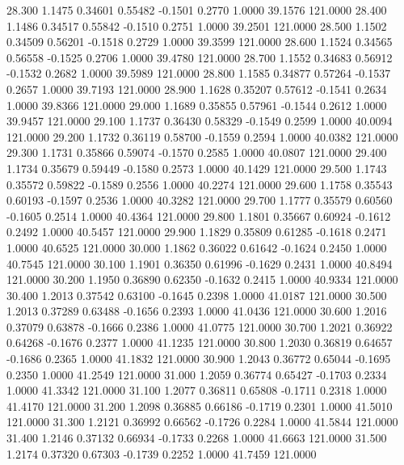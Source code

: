   28.300   1.1475   0.34601   0.55482  -0.1501   0.2770   1.0000  39.1576 121.0000
  28.400   1.1486   0.34517   0.55842  -0.1510   0.2751   1.0000  39.2501 121.0000
  28.500   1.1502   0.34509   0.56201  -0.1518   0.2729   1.0000  39.3599 121.0000
  28.600   1.1524   0.34565   0.56558  -0.1525   0.2706   1.0000  39.4780 121.0000
  28.700   1.1552   0.34683   0.56912  -0.1532   0.2682   1.0000  39.5989 121.0000
  28.800   1.1585   0.34877   0.57264  -0.1537   0.2657   1.0000  39.7193 121.0000
  28.900   1.1628   0.35207   0.57612  -0.1541   0.2634   1.0000  39.8366 121.0000
  29.000   1.1689   0.35855   0.57961  -0.1544   0.2612   1.0000  39.9457 121.0000
  29.100   1.1737   0.36430   0.58329  -0.1549   0.2599   1.0000  40.0094 121.0000
  29.200   1.1732   0.36119   0.58700  -0.1559   0.2594   1.0000  40.0382 121.0000
  29.300   1.1731   0.35866   0.59074  -0.1570   0.2585   1.0000  40.0807 121.0000
  29.400   1.1734   0.35679   0.59449  -0.1580   0.2573   1.0000  40.1429 121.0000
  29.500   1.1743   0.35572   0.59822  -0.1589   0.2556   1.0000  40.2274 121.0000
  29.600   1.1758   0.35543   0.60193  -0.1597   0.2536   1.0000  40.3282 121.0000
  29.700   1.1777   0.35579   0.60560  -0.1605   0.2514   1.0000  40.4364 121.0000
  29.800   1.1801   0.35667   0.60924  -0.1612   0.2492   1.0000  40.5457 121.0000
  29.900   1.1829   0.35809   0.61285  -0.1618   0.2471   1.0000  40.6525 121.0000
  30.000   1.1862   0.36022   0.61642  -0.1624   0.2450   1.0000  40.7545 121.0000
  30.100   1.1901   0.36350   0.61996  -0.1629   0.2431   1.0000  40.8494 121.0000
  30.200   1.1950   0.36890   0.62350  -0.1632   0.2415   1.0000  40.9334 121.0000
  30.400   1.2013   0.37542   0.63100  -0.1645   0.2398   1.0000  41.0187 121.0000
  30.500   1.2013   0.37289   0.63488  -0.1656   0.2393   1.0000  41.0436 121.0000
  30.600   1.2016   0.37079   0.63878  -0.1666   0.2386   1.0000  41.0775 121.0000
  30.700   1.2021   0.36922   0.64268  -0.1676   0.2377   1.0000  41.1235 121.0000
  30.800   1.2030   0.36819   0.64657  -0.1686   0.2365   1.0000  41.1832 121.0000
  30.900   1.2043   0.36772   0.65044  -0.1695   0.2350   1.0000  41.2549 121.0000
  31.000   1.2059   0.36774   0.65427  -0.1703   0.2334   1.0000  41.3342 121.0000
  31.100   1.2077   0.36811   0.65808  -0.1711   0.2318   1.0000  41.4170 121.0000
  31.200   1.2098   0.36885   0.66186  -0.1719   0.2301   1.0000  41.5010 121.0000
  31.300   1.2121   0.36992   0.66562  -0.1726   0.2284   1.0000  41.5844 121.0000
  31.400   1.2146   0.37132   0.66934  -0.1733   0.2268   1.0000  41.6663 121.0000
  31.500   1.2174   0.37320   0.67303  -0.1739   0.2252   1.0000  41.7459 121.0000
